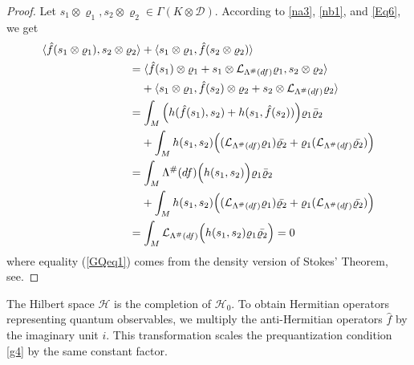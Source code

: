 \documentclass[a4paper,10pt]{article}
\numberwithin{equation}{section}
\theoremstyle{plain}
\begin{document}
	\begin{proof}
		Let $s_1 \otimes \varrho_1,s_2 \otimes \varrho_2\in \Gamma(K \otimes \mathcal{D})$.  According to \eqref{na3}, \eqref{nb1},  and  \eqref{Eq6}, we get
		\begin{align}\nonumber
		\langle \hat{f}(s_1 \otimes \varrho_1), s_2 \otimes \varrho_2 \rangle&+\langle s_1 \otimes \varrho_1,\hat{f}( s_2 \otimes \varrho_2) \rangle\nonumber\\ & \hspace{-0.375cm}= \langle\hat{f}(s_1)\otimes\varrho_1+s_1\otimes\mathcal{L}_{\Lambda^\#(df)}\varrho_1,s_2 \otimes \varrho_2\rangle\nonumber\\&+\langle s_1 \otimes \varrho_1,\hat{f}(s_2)\otimes\varrho_2+s_2\otimes\mathcal{L}_{\Lambda^\#(df)}\varrho_2\rangle
		\nonumber\\ &\hspace{-0.375cm}=
		\int_M\Big( h(\hat{f}(s_1),s_2) +h(s_1,\hat{f}(s_2) )\Big) \varrho_1 \bar{\varrho}_2\nonumber\\ & +
		 \int_Mh(s_1,s_2)\Big((\mathcal{L}_{\Lambda^\#(df)}\varrho_1)\bar{\varrho_2}+\varrho_1(\mathcal{L}_{\Lambda^\#(df)}\bar{\varrho_2})\Big)\nonumber\\ &\hspace{-0.375cm}=
		\int_M\Lambda^\#(df)\Big(h(s_1,s_2)\Big) \varrho_1 \bar{\varrho}_2
		\nonumber \\& +\int_Mh(s_1,s_2)\Big((\mathcal{L}_{\Lambda^\#(df)}\varrho_1)\bar{\varrho_2}+\varrho_1(\mathcal{L}_{\Lambda^\#(df)}\bar{\varrho_2})\Big)
		\nonumber \\ &\hspace{-0.375cm}=
		\int_M\mathcal{L}_{\Lambda^\#(df)}\Big(h(s_1,s_2)\varrho_1\bar{\varrho_2}\Big)
		=0\label{GQeq1}
		\end{align}
		where equality (\ref{GQeq1}) comes from the density version of Stokes' Theorem, see\cite{R27}.
	\end{proof}
	
	The Hilbert space $\mathcal{H}$ is the completion of $\mathcal{H}_0$. To obtain Hermitian operators representing quantum observables, we multiply the anti-Hermitian operators $\hat{f}$ by the imaginary unit $i$. This transformation scales the prequantization condition \eqref{g4} by the same constant factor.
	
\end{document}
